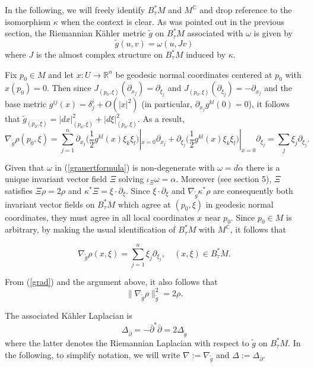 \documentclass[11pt,reqno]{amsart}
\newcommand{\C}{{\mathbb C}}
\theoremstyle{definition}
\begin{document}
 In the following, we will freely identify $B_{\tau}^*M$ and $M^{\mathbb C}$ and drop reference to the isomorphism  $\kappa$ when the context is clear. As was pointed out in the previous section, the Riemannian K\"ahler metric $\tilde{g}$ on $B_\tau^* M$ associated with $\omega$ is given by
  $$ \tilde{g}(u,v) = \omega (u, Jv)$$
  where $J$ is the almost complex structure on $B_\tau^*M$ induced by $\kappa.$
  
  
 Fix $p_0 \in M$ and let $x: U \to {\mathbb R}^n$ be geodesic normal coordinates centered at $p_0$ with $x(p_0) = 0.$ Then since $J_{(p_0,\xi)} (\partial_{x_j}) = \partial_{\xi_j}$ and $J_{(p_0,\xi)}(\partial_{\xi_j}) = - \partial_{x_j}$ and the base metric $g^{ij}(x) = \delta_j^i + O(|x|^2)$ (in particular, $\partial_{x_j} g^{kl}(0) = 0$),  it follows that 
 $ \tilde{g}_{(p_0,\xi)} = |dx|_{(p_0,\xi)}^2 + |d\xi|_{(p_0,\xi)}^2.$   As a result,
 $$ \nabla_{\tilde{g}} \rho (p_0,\xi) =   \sum_{j=1}^{n} \partial_{x_j}  \big( \frac{1}{2} g^{kl}(x) \xi_k \xi_l \big) |_{x=0}  \partial_{x_j} + \partial_{\xi_j} \big( \frac{1}{2} g^{kl}(x) \xi_k \xi_l \big)|_{x=0} \partial_{\xi_j}   = \sum_{j} \xi_j \partial_{\xi_j}.$$
 
 Given that  $\omega$ in (\ref{grauertformula}) is non-degenerate with $\omega = d\alpha$ there is a unique invariant  vector field $\Xi$ solving  $\iota_\Xi \omega = \alpha.$ Moreover (see \cite{GS91} section 5), $\Xi$ satisfies 
 $\Xi \rho = 2 \rho$ and $\kappa^* \Xi = \xi \cdot \partial_{\xi}$. Since $\xi \cdot \partial_{\xi}$ and $\nabla_{\tilde{g}} \kappa^*\rho$ are consequently both invariant vector fields on $B_\tau^*M$ which agree at $(p_0,\xi)$ in geodesic normal coordinates, they must agree in all local coordinates $x$ near $p_0$. Since $p_0 \in M$ is arbitrary, by making the usual identification of $B_\tau^*M$ with $M^{\C}$, it follows that
 
    \begin{equation} \label{grad}
\nabla_{\tilde{g}} \rho (x,\xi)  = \sum_{j=1}^n \xi_j \partial_{\xi_j}, \quad (x,\xi) \in B_{\tau}^*M.
\end{equation}

From (\ref{grad}) and the argument above, it also follows that
 \begin{equation} \label{gradnorm}
\| \nabla_{\tilde{g}} \rho \|_{\tilde{g}}^2 = 2 \rho.
\end{equation}

The associated K\"ahler Laplacian is 
$$ \Delta_{\overline{\partial}} = -\overline{\partial}^* \overline{\partial} = 2 \Delta_{\tilde{g}}$$
where the latter denotes the Riemannian Laplacian with respect to $\tilde{g}$ on $B_\tau^*M.$
In the following, to simplify notation, we will write $\nabla := \nabla_{\tilde{g}}$ and $\Delta := \Delta_{\overline{\partial}}.$
\end{document}
